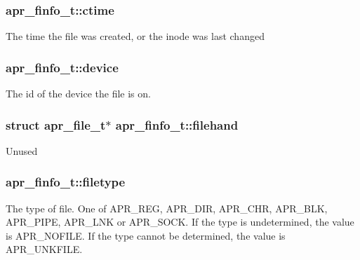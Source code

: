 \subsubsection[{\texorpdfstring{ctime}{ctime}}]{ apr\+\_\+finfo\+\_\+t\+::ctime}\hypertarget{structapr__finfo__t_aebbdb3dc755d825de3dce901cfba0883}{}\label{structapr__finfo__t_aebbdb3dc755d825de3dce901cfba0883}
The time the file was created, or the inode was last changed 
\subsubsection[{\texorpdfstring{device}{device}}]{ apr\+\_\+finfo\+\_\+t\+::device}\hypertarget{structapr__finfo__t_a38cbfbff641284065481f5907d59c8bf}{}\label{structapr__finfo__t_a38cbfbff641284065481f5907d59c8bf}
The id of the device the file is on. 
\subsubsection[{\texorpdfstring{filehand}{filehand}}]{\setlength{\rightskip}{0pt plus 5cm}struct {\bf apr\+\_\+file\+\_\+t}$\ast$ apr\+\_\+finfo\+\_\+t\+::filehand}\hypertarget{structapr__finfo__t_a7858e3d9c5f6ed062d9ff7f5c79b6336}{}\label{structapr__finfo__t_a7858e3d9c5f6ed062d9ff7f5c79b6336}
Unused 
\subsubsection[{\texorpdfstring{filetype}{filetype}}]{ apr\+\_\+finfo\+\_\+t\+::filetype}\hypertarget{structapr__finfo__t_a274ae0dd60b59182c2e0134bc9a09a20}{}\label{structapr__finfo__t_a274ae0dd60b59182c2e0134bc9a09a20}
The type of file. One of A\+P\+R\+\_\+\+R\+EG, A\+P\+R\+\_\+\+D\+IR, A\+P\+R\+\_\+\+C\+HR, A\+P\+R\+\_\+\+B\+LK, A\+P\+R\+\_\+\+P\+I\+PE, A\+P\+R\+\_\+\+L\+NK or A\+P\+R\+\_\+\+S\+O\+CK. If the type is undetermined, the value is A\+P\+R\+\_\+\+N\+O\+F\+I\+LE. If the type cannot be determined, the value is A\+P\+R\+\_\+\+U\+N\+K\+F\+I\+LE. 
